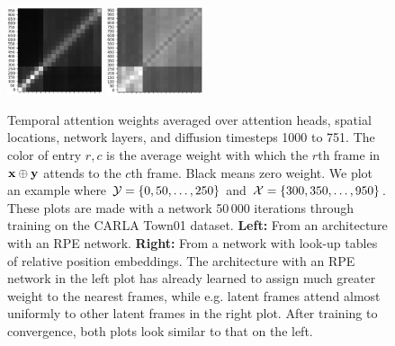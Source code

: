\begin{figure}
    \centering
    \includegraphics[width=0.25\textwidth]{figs/fdm/attn_masks/w_rpe.png}
    \includegraphics[width=0.25\textwidth]{figs/fdm/attn_masks/wo_rpe.png}
    \caption{Temporal attention weights averaged over attention heads, spatial locations, network layers, and diffusion timesteps 1000 to 751. The color of entry $r,c$ is the average weight with which the $r$th frame in ${\mathbf{x}}\oplus{\mathbf{y}}$ attends to the $c$th frame. Black means zero weight. We plot an example where $\mathcal{Y}=\{0,50,\ldots,250\}$ and $\mathcal{X}=\{300, 350,\ldots,950\}$. These plots are made with a network 50\,000 iterations through training on the CARLA Town01 dataset. \textbf{Left:} From an architecture with an RPE network. \textbf{Right:} From a network with look-up tables of relative position embeddings. The architecture with an RPE network in the left plot has already learned to assign much greater weight to the nearest frames, while e.g. latent frames attend almost uniformly to other latent frames in the right plot. After training to convergence, both plots look similar to that on the left.  }
    \label{fig:fdm-rpe-net-attn-weights}
\end{figure}



